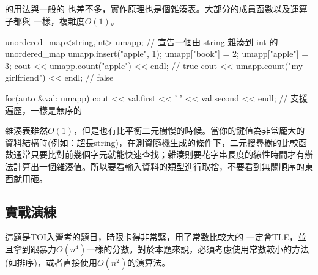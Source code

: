 \documentclass[main.tex]{subfiles}
\begin{document}
\subsection{}
 的用法與一般的  也差不多，實作原理也是個雜湊表。大部分的成員函數以及運算子都與  一樣，複雜度$O(1)$。
\begin{C++}
unordered_map<string,int> umapp;
// 宣告一個由 string 雜湊到 int 的 unordered_map
umapp.insert({"apple", 1});
umapp["book"] = 2;
umapp["apple"] = 3;
cout << umapp.count("apple") << endl; // true
cout << umapp.count("my girlfriend") << endl; // false

for(auto &val: umapp)
    cout << val.first << ' ' << val.second << endl;
// 支援遍歷，一樣是無序的
\end{C++}
\indent\indent 雜湊表雖然$O(1)$，但是也有比平衡二元樹慢的時候。當你的鍵值為非常龐大的資料結構時(例如：超長string)，在測資隨機生成的條件下，二元搜尋樹的比較函數通常只要比對前幾個字元就能快速查找；雜湊則要花字串長度的線性時間才有辦法計算出一個雜湊值。所以要看輸入資料的類型進行取捨，不要看到無關順序的東西就用砸。
\subsection{實戰演練}
這題是TOI入營考的題目，時限卡得非常緊，用了常數比較大的  一定會TLE，並且拿到跟暴力$O(n^4)$一樣的分數。對於本題來說，必須考慮使用常數較小的方法(如排序)，或者直接使用$O(n^2)$的演算法。
\end{document}
